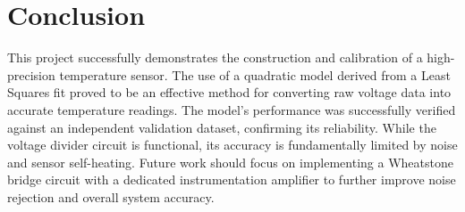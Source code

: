 \documentclass[conference]{IEEEtran}
\begin{document}
\section{Conclusion}
This project successfully demonstrates the construction and calibration of a high-precision temperature sensor. The use of a quadratic model derived from a Least Squares fit proved to be an effective method for converting raw voltage data into accurate temperature readings. The model's performance was successfully verified against an independent validation dataset, confirming its reliability. While the voltage divider circuit is functional, its accuracy is fundamentally limited by noise and sensor self-heating. Future work should focus on implementing a Wheatstone bridge circuit with a dedicated instrumentation amplifier to further improve noise rejection and overall system accuracy.
\end{document}
